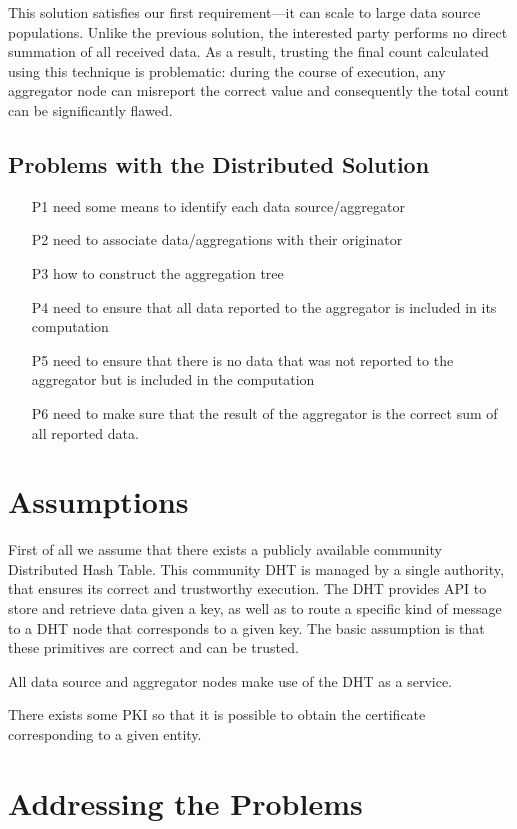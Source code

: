\documentclass{article}
\begin{document}
This solution satisfies our first requirement---it can scale to large
data source populations. Unlike the previous solution, the interested
party performs no direct summation of all received data. As a result,
trusting the final count calculated using this technique is
problematic: during the course of execution, any aggregator node can
misreport the correct value and consequently the total count can be
significantly flawed.

\subsection{Problems with the Distributed Solution}
\begin{itemize}
\item [P1] need some means to identify each data source/aggregator
\item [P2] need to associate data/aggregations with their originator
\item [P3] how to construct the aggregation tree
\item [P4] need to ensure that all data reported to the aggregator is included
in its computation
\item [P5] need to ensure that there is no data that was not reported to the
aggregator but is included in the computation
\item [P6] need to make sure that the result of the aggregator is the correct
sum of all reported data.
\end{itemize}

\section{Assumptions}
First of all we assume that there exists a publicly available
community Distributed Hash Table. This community DHT is managed by a
single authority, that ensures its correct and trustworthy
execution. The DHT provides API to store and retrieve data given a key,
as well as to route a specific kind of message to a DHT node that
corresponds to a given key. The basic assumption is that these
primitives are correct and can be trusted.

All data source and aggregator nodes make use of the DHT as a
service. 

There exists some PKI so that it is possible to obtain the certificate
corresponding to a given entity.

\section{Addressing the Problems}
\end{document}
